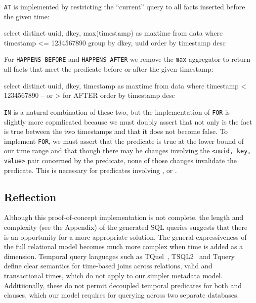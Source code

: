 \texttt{AT} is implemented by restricting the ``current'' query to all facts inserted before the given time:

\begin{sqlcode}
select distinct uuid, dkey, max(timestamp) as maxtime
from data where timestamp <= 1234567890
group by dkey, uuid order by timestamp desc
\end{sqlcode}

For \texttt{HAPPENS BEFORE} and \texttt{HAPPENS AFTER} we remove the \texttt{max} aggregator to return all facts that meet the predicate
before or after the given timestamp:

\begin{sqlcode}
select distinct uuid, dkey, timestamp as maxtime
from data
where timestamp < 1234567890 -- or > for AFTER
order by timestamp desc
\end{sqlcode}

\texttt{IN} is a natural combination of these two, but the implementation of
\texttt{FOR} is slightly more copmlicated because we must doubly assert that
not only is the fact is true between the two timestamps and that it does not
become false. To implement \texttt{FOR}, we must assert that the predicate is
true at the lower bound of our time range and that though there may be changes
involving the \texttt{<uuid, key, value>} pair concerned by the predicate, none
of those changes invalidate the predicate. This is necessary for predicates
involving ,  or .

\subsection{Reflection}

Although this proof-of-concept implementation is not complete, the length and
complexity (see the Appendix) of the generated SQL queries suggests that there is an opportunity
for a more appropriate solution. The general expressiveness of the full
relational model becomes much more complex when time is added as a dimension.
Temporal query languages such as TQuel~\cite{snodgrass1987temporal},
TSQL2~\cite{snodgrass2012tsql2} and Tquery~\cite{kahn1991tquery} define clear
semantics for time-based joins across relations, valid and transactional times,
which do not apply to our simpler metadata model.
Additiionally, these do not permit decoupled temporal predicates for both
 and  clauses, which our model requires for
querying across two separate databases.


